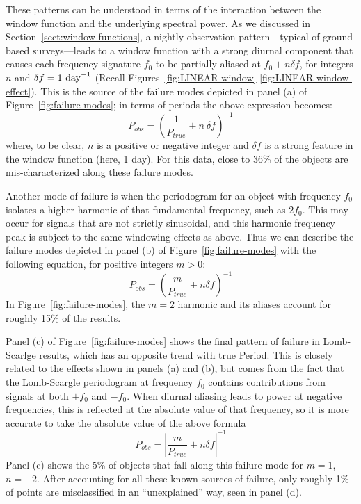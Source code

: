 \documentclass[preprint]{aastex}
\newcommand{\fig}[1]{Figure~\ref{fig:#1}}
\newcommand{\figs}[2]{Figures~\ref{fig:#1}-\ref{fig:#2}}
\newcommand{\eqlabel}[1]{\label{eq:#1}}
\newcommand{\Sect}[1]{Section~\ref{sect:#1}}
\newcommand{\sect}[1]{\Sect{#1}}
\begin{document}
These patterns can be understood in terms of the interaction between the
window function and the underlying spectral power.
As we discussed in \sect{window-functions},
a nightly observation pattern---typical of ground-based surveys---leads to
a window function with a strong diurnal component that causes each frequency
signature $f_0$ to be partially aliased at $f_0 + n \delta f$, for integers
$n$ and $\delta f = 1\ {\rm day}^{-1}$
(Recall \figs{LINEAR-window}{LINEAR-window-effect}).
This is the source of the failure modes depicted in panel (a) of
\fig{failure-modes}; in terms of periods the above expression becomes:
\begin{equation}
  P_{obs} = \left(\frac{1}{P_{true}} + n\ \delta f\right)^{-1}
\end{equation}
where, to be clear, $n$ is a positive or negative integer and $\delta f$ is
a strong feature in the window function (here, 1 day).
For this data, close to 36\% of the objects are mis-characterized along these
failure modes.

Another mode of failure is when the periodogram for an object with frequency
$f_0$ isolates a higher harmonic of that fundamental frequency, such as $2f_0$.
This may occur for signals that are not strictly sinusoidal, and this harmonic
frequency peak is subject to the same windowing effects as above.
Thus we can describe the failure modes depicted in panel (b) of \fig{failure-modes} with the following equation, for positive integers $m > 0$:
\begin{equation}
  P_{obs} = \left(\frac{m}{P_{true}} + n\delta f\right)^{-1}
\end{equation}
In \fig{failure-modes}, the $m=2$ harmonic and its aliases account for roughly
15\% of the results.

Panel (c) of \fig{failure-modes} shows the final pattern of failure in
Lomb-Scarlge results, which has an opposite trend with true Period.
This is closely related to the effects shown in panels (a) and (b),
but comes from the fact that
the Lomb-Scargle periodogram at frequency $f_0$ contains contributions from
signals at both $+f_0$ and $-f_0$.
When diurnal aliasing leads to power at negative frequencies, this is reflected
at the absolute value of that frequency, so it is more accurate to take the
absolute value of the above formula
\begin{equation}
  P_{obs} = \left|\frac{m}{P_{true}} + n\delta f\right|^{-1}
  \eqlabel{failure-modes}
\end{equation}
Panel (c) shows the 5\% of objects that fall along this failure mode for
$m=1$, $n=-2$.
After accounting for all these known sources of failure, only roughly
1\% of points are misclassified in an ``unexplained'' way, seen in panel (d).
\end{document}
